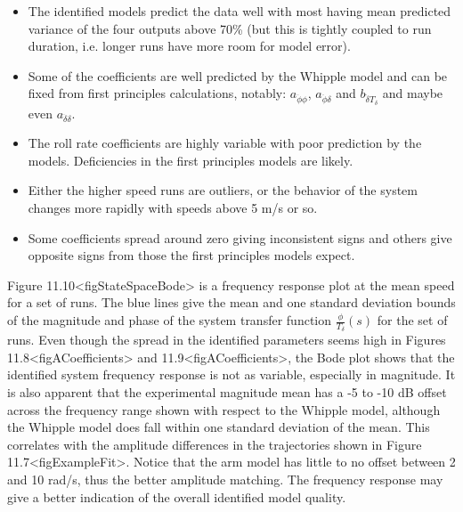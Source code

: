 \documentclass[a4paper]{article}
\begin{document}
\begin{itemize}
  \item
    The identified models predict the data well with most having mean
    predicted variance of the four outputs above 70\% (but this is tightly
    coupled to run duration, i.e. longer runs have more room for model
    error).
  \item
    Some of the coefficients are well predicted by the Whipple model and
    can be fixed from first principles calculations, notably:
    $a_{\ddot{\phi}\phi}$, $a_{\ddot{\phi}\delta}$ and
    $b_{\ddot{\delta}T_\delta}$ and maybe even $a_{\ddot{\delta}\delta}$.
  \item
    The roll rate coefficients are highly variable with poor prediction by
    the models. Deficiencies in the first principles models are likely.
  \item
    Either the higher speed runs are outliers, or the behavior of the
    system changes more rapidly with speeds above 5 m/s or so.
  \item
    Some coefficients spread around zero giving inconsistent signs and
    others give opposite signs from those the first principles models
    expect.
\end{itemize}



Figure 11.10\textless{}figStateSpaceBode\textgreater{} is a frequency 
response plot at the mean speed for a set of runs. The blue lines give the mean and one standard
deviation bounds of the magnitude and phase of the system transfer
function $\frac{\phi}{T_\delta}(s)$ for the set of runs. Even though the
spread in the identified parameters seems high in Figures
11.8\textless{}figACoefficients\textgreater{} and
11.9\textless{}figACoefficients\textgreater{}, the Bode plot shows that
the identified system frequency response is not as variable, especially
in magnitude. It is also apparent that the experimental magnitude mean
has a -5 to -10 dB offset across the frequency range shown with respect
to the Whipple model, although the Whipple model does fall within one
standard deviation of the mean. This correlates with the amplitude
differences in the trajectories shown in
Figure 11.7\textless{}figExampleFit\textgreater{}. Notice that the arm
model has little to no offset between 2 and 10 rad/s, thus the better
amplitude matching. The frequency response may give a better indication
of the overall identified model quality.
\end{document}
